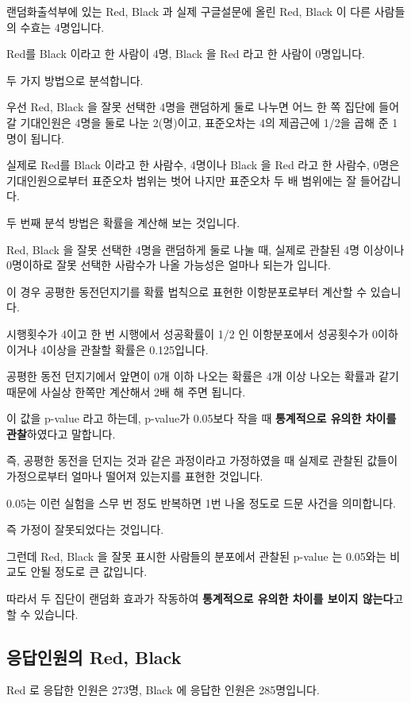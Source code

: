 \documentclass[
]{book}
\begin{document}
랜덤화출석부에 있는 Red, Black 과 실제 구글설문에 올린 Red, Black 이 다른 사람들의 수효는 4명입니다.

Red를 Black 이라고 한 사람이 4명, Black 을 Red 라고 한 사람이 0명입니다.

두 가지 방법으로 분석합니다.

우선 Red, Black 을 잘못 선택한 4명을 랜덤하게 둘로 나누면 어느 한 쪽 집단에 들어갈 기대인원은 4명을 둘로 나눈 2(명)이고, 표준오차는 4의 제곱근에 1/2을 곱해 준 1명이 됩니다.

실제로 Red를 Black 이라고 한 사람수, 4명이나 Black 을 Red 라고 한 사람수, 0명은 기대인원으로부터 표준오차 범위는 벗어 나지만 표준오차 두 배 범위에는 잘 들어갑니다.

두 번째 분석 방법은 확률을 계산해 보는 것입니다.

Red, Black 을 잘못 선택한 4명을 랜덤하게 둘로 나눌 때, 실제로 관찰된 4명 이상이나 0명이하로 잘못 선택한 사람수가 나올 가능성은 얼마나 되는가 입니다.

이 경우 공평한 동전던지기를 확률 법칙으로 표현한 이항분포로부터 계산할 수 있습니다.

시행횟수가 4이고 한 번 시행에서 성공확률이 1/2 인 이항분포에서 성공횟수가 0이하이거나 4이상을 관찰할 확률은 0.125입니다.

공평한 동전 던지기에서 앞면이 0개 이하 나오는 확률은 4개 이상 나오는 확률과 같기 때문에 사실상 한쪽만 계산해서 2배 해 주면 됩니다.

이 값을 p-value 라고 하는데, p-value가 0.05보다 작을 때 \textbf{통계적으로 유의한 차이를 관찰}하였다고 말합니다.

즉, 공평한 동전을 던지는 것과 같은 과정이라고 가정하였을 때 실제로 관찰된 값들이 가정으로부터 얼마나 떨어져 있는지를 표현한 것입니다.

0.05는 이런 실험을 스무 번 정도 반복하면 1번 나올 정도로 드문 사건을 의미합니다.

즉 가정이 잘못되었다는 것입니다.

그런데 Red, Black 을 잘못 표시한 사람들의 분포에서 관찰된 p-value 는 0.05와는 비교도 안될 정도로 큰 값입니다.

따라서 두 집단이 랜덤화 효과가 작동하여 \textbf{통계적으로 유의한 차이를 보이지 않는다}고 할 수 있습니다.

\subsection{응답인원의 Red, Black}\label{uxc751uxb2f5uxc778uxc6d0uxc758-red-black-5}

Red 로 응답한 인원은 273명, Black 에 응답한 인원은 285명입니다.
\end{document}
